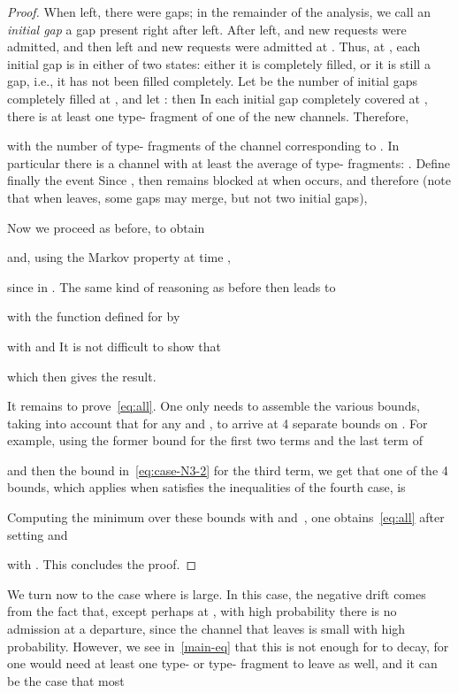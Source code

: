 \documentclass{amsart}
\begin{document}
\begin{proof}
When  left, there were  gaps; in the remainder
of the analysis, we call an \emph{initial gap} a gap present right
after  left. After  left,  and  new
requests were admitted, and then  left and  new requests
were admitted at . Thus, at , each initial gap is in
either of two states: either it is completely filled, or it is still
a gap, i.e., it has not been filled completely. Let  be the
number of initial gaps completely filled at , and let : then  In each initial gap completely
covered at , there is at least one type- fragment of one of
the  new channels. Therefore,
    
with  the number of type- fragments of the channel corresponding to .
In particular there is a channel  with at least the average  of type- fragments:
. Define finally the event  Since , then  remains blocked at  when
 occurs, and therefore (note that when  leaves, some gaps
may merge, but not two initial gaps),
    
Now we proceed as before, to obtain
    
and, using the Markov property at time ,

since  in . The same kind of reasoning
as before then leads to

with the function  defined for  by

with  and
 It is not
difficult to show that
    
which then gives the result.


It remains to prove~\eqref{eq:all}. One only needs to assemble the
various bounds, taking into account  that  for any  and , to
arrive at 4 separate bounds on .  For
example, using the former bound for the first two terms and the last
term of

and then the bound in~\eqref{eq:case-N3-2} for the third term, we
get that one of the 4 bounds, which applies when  satisfies the
inequalities of the fourth case, is

Computing the minimum over these bounds with 
and~, one obtains~\eqref{eq:all} after setting
 and
    
with . This concludes the proof.
\end{proof}
We turn now to  the case where  is large.  In this case,  the
negative drift comes from the fact that, except  perhaps at ,
with high probability there  is no admission at a departure, since
the  channel that leaves is small with high  probability. However,
we see in~\eqref{main-eq} that this  is not enough for   to
decay, for one  would need at least one type- or type-
fragment to leave as well, and it can be the case that most
\end{document}
